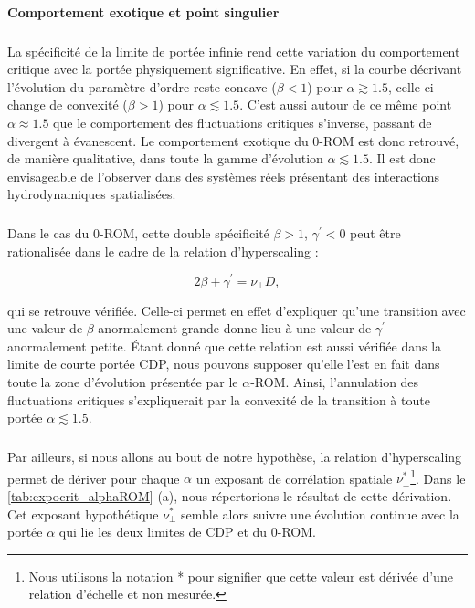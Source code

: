 \paragraph{Comportement exotique et point singulier}

\subparagraph{}La spécificité de la limite de portée infinie rend cette variation du comportement critique avec la portée physiquement significative. En effet, si la courbe décrivant l'évolution du paramètre d'ordre reste concave ($\beta < 1$) pour $\alpha \gtrsim 1.5$, celle-ci change de convexité ($\beta >1$) pour $\alpha \lesssim 1.5$. C'est aussi autour de ce même point $\alpha \approx 1.5$ que le comportement des fluctuations critiques s'inverse, passant de divergent à évanescent. Le comportement exotique du 0-ROM est donc retrouvé, de manière qualitative, dans toute la gamme d'évolution $\alpha \lesssim 1.5$. Il est donc envisageable de l'observer dans des systèmes réels présentant des interactions hydrodynamiques spatialisées.

\subparagraph{}Dans le cas du 0-ROM, cette double spécificité $\beta>1$, $\gamma^\prime<0$ peut être rationalisée dans le cadre de la relation d'hyperscaling \cite{lubeck_universal_2004, mari_absorbing_2022} :

\begin{equation}
	2\beta + \gamma^\prime = \nu_\perp D,
\end{equation}

\noindent qui se retrouve vérifiée. Celle-ci permet en effet d'expliquer qu'une transition avec une valeur de $\beta$ anormalement grande donne lieu à une valeur de $\gamma^\prime$ anormalement petite. Étant donné que cette relation est aussi vérifiée dans la limite de courte portée CDP, nous pouvons supposer qu'elle l'est en fait dans toute la zone d'évolution présentée par le $\alpha$-ROM. Ainsi, l'annulation des fluctuations critiques s'expliquerait par la convexité de la transition à toute portée $\alpha \lesssim 1.5$.

\subparagraph{}Par ailleurs, si nous allons au bout de notre hypothèse, la relation d'hyperscaling permet de dériver pour chaque $\alpha$ un exposant de corrélation spatiale $\nu_\perp^*$\footnote{Nous utilisons la notation * pour signifier que cette valeur est dérivée d'une relation d'échelle et non mesurée.}. Dans le \autoref{tab:expocrit_alphaROM}-(a), nous répertorions le résultat de cette dérivation. Cet exposant hypothétique $\nu_\perp^*$ semble alors suivre une évolution continue avec la portée $\alpha$ qui lie les deux limites de CDP et du 0-ROM.

